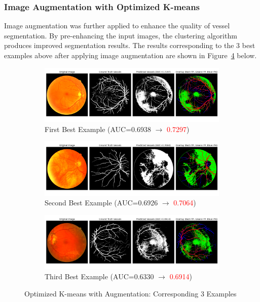 \documentclass[12pt,letterpaper]{article}
\begin{document}
\subsubsection{Image Augmentation with Optimized K-means}
Image augmentation was further applied to enhance the quality of vessel segmentation. By pre-enhancing the input images, the clustering algorithm produces improved segmentation results. The results corresponding to the 3 best examples above after applying image augmentation are shown in Figure~\ref{fig:opt_aug} below. 
\begin{figure}[H]
    \centering
    \begin{subfigure}[H]{\textwidth}
        \centering
        \includegraphics[scale=0.35]{Figures/4 Optimized 1st.png}
        \vspace{-0.5cm}
        \caption{First Best Example (AUC=0.6938 $\rightarrow$ \textcolor{red}{0.7297})}
        \label{fig:opt_aug1}
    \end{subfigure}
    \begin{subfigure}[H]{\textwidth}
        \centering
        \includegraphics[scale=0.35]{Figures/4 Optimized 2nd.png}
        \vspace{-0.5cm}
        \caption{Second Best Example (AUC=0.6926 $\rightarrow$ \textcolor{red}{0.7064})}
        \label{fig:opt_aug2}
    \end{subfigure}
    \begin{subfigure}[H]{\textwidth}
        \centering
        \includegraphics[scale=0.35]{Figures/4 Optimized 3rd.png}
        \vspace{-0.5cm}
        \caption{Third Best Example (AUC=0.6330 $\rightarrow$ \textcolor{red}{0.6914})}
        \label{fig:opt_aug3}
    \end{subfigure}
    \caption{Optimized K-means with Augmentation: Corresponding 3 Examples}
    \label{fig:opt_aug}
\end{figure}
\end{document}
